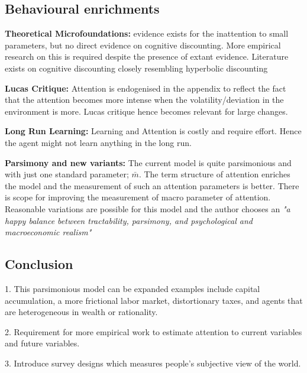 \documentclass{beamer}
\begin{document}
\subsection{Behavioural enrichments}

\begin{frame}{\subsecname}
\textbf{Theoretical Microfoundations:} evidence exists for the inattention to small parameters, but no direct evidence on cognitive discounting. More empirical research on this is required despite the presence of extant evidence. Literature exists on cognitive discounting closely resembling hyperbolic discounting

\textbf{Lucas Critique:} Attention is endogenised in the appendix to reflect the fact that the attention becomes more intense when the volatility/deviation in the environment is more. Lucas critique hence becomes relevant for large changes. 

\end{frame}

\begin{frame}{\subsecname}
\textbf{Long Run Learning:} Learning and Attention is costly and require effort. Hence the agent might not learn anything in the long run. 

\textbf{Parsimony and new variants:} The current model is quite parsimonious and with just one standard parameter; $\bar{m}$. The term structure of attention enriches the model and the measurement of such an attention parameters is better. There is scope for improving the measurement of macro parameter of attention. Reasonable variations are possible for this model and the author chooses an \textit{"a happy balance between tractability, parsimony, and psychological and macroeconomic realism"}
\end{frame}

\subsection{Conclusion}
\begin{frame}{\subsecname}

1. This parsimonious model can be expanded examples include capital accumulation, a more frictional labor market, distortionary taxes, and agents that are heterogeneous in wealth or rationality.

2. Requirement for more empirical work to estimate attention to current variables and future variables.

3. Introduce survey designs which measures people's subjective view of the world. 

\end{frame}
\end{document}
